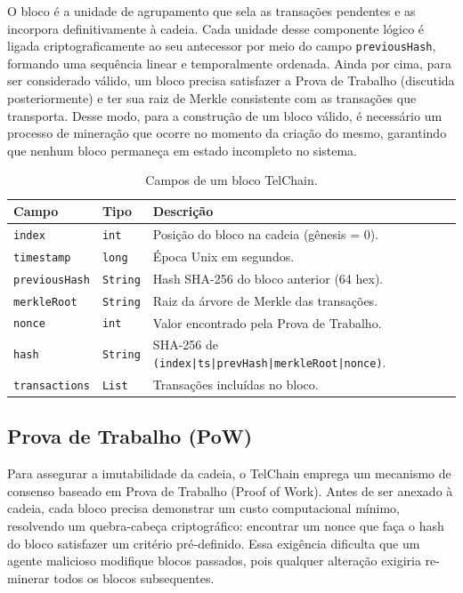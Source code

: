 \documentclass[12pt, a4paper]{article}
\begin{document}
O bloco é a unidade de agrupamento que sela as transações pendentes e as incorpora
definitivamente à cadeia. Cada unidade desse componente lógico é ligada criptograficamente ao seu antecessor por meio do campo \texttt{previousHash}, formando uma sequência linear e temporalmente ordenada. Ainda por cima, para ser considerado válido, um bloco precisa satisfazer a Prova de Trabalho (discutida posteriormente) e ter sua raiz de Merkle consistente com as transações que transporta. Desse modo, para a construção de um bloco válido, é necessário um processo de mineração que ocorre no momento da criação do mesmo, garantindo que nenhum bloco permaneça em estado incompleto no sistema.

\begin{table}[H]
\centering
\caption{Campos de um bloco TelChain.}
\label{tab:block}
\begin{tabular}{llp{7cm}}
\toprule
\textbf{Campo} & \textbf{Tipo} & \textbf{Descrição} \\
\midrule
\texttt{index}        & \texttt{int}    & Posição do bloco na cadeia (gênesis = 0). \\
\texttt{timestamp}    & \texttt{long}   & Época Unix em segundos. \\
\texttt{previousHash} & \texttt{String} & Hash SHA-256 do bloco anterior (64 hex). \\
\texttt{merkleRoot}   & \texttt{String} & Raiz da árvore de Merkle das transações. \\
\texttt{nonce}        & \texttt{int}    & Valor encontrado pela Prova de Trabalho. \\
\texttt{hash}         & \texttt{String} & SHA-256 de \texttt{(index|ts|prevHash|merkleRoot|nonce)}. \\
\texttt{transactions} & \texttt{List}   & Transações incluídas no bloco. \\
\bottomrule
\end{tabular}
\end{table}

\subsection{Prova de Trabalho (PoW)}

Para assegurar a imutabilidade da cadeia, o TelChain emprega um mecanismo de
consenso baseado em Prova de Trabalho (Proof of Work). Antes de ser anexado à
cadeia, cada bloco precisa demonstrar um custo computacional mínimo, resolvendo
um quebra-cabeça criptográfico: encontrar um nonce que faça o hash do bloco
satisfazer um critério pré‑definido. Essa exigência dificulta que um agente
malicioso modifique blocos passados, pois qualquer alteração exigiria re-minerar
todos os blocos subsequentes.
\end{document}
